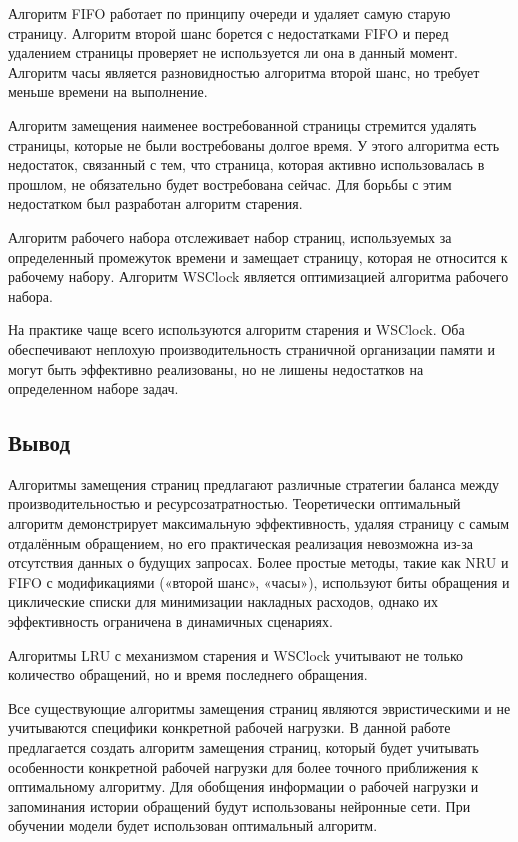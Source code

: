 Алгоритм FIFO работает по принципу очереди и удаляет самую старую страницу.
Алгоритм второй шанс борется с недостатками FIFO и перед удалением страницы проверяет не используется ли она в данный момент.
Алгоритм часы является разновидностью алгоритма второй шанс, но требует меньше времени на выполнение.

Алгоритм замещения наименее востребованной страницы стремится удалять страницы, которые не были востребованы долгое время. 
У этого алгоритма есть недостаток, связанный с тем, что страница, которая активно использовалась в прошлом, не обязательно будет востребована сейчас. 
Для борьбы с этим недостатком был разработан алгоритм старения.

Алгоритм рабочего набора отслеживает набор страниц, используемых за определенный промежуток времени и замещает страницу, которая не относится к рабочему набору.
Алгоритм WSClock является оптимизацией алгоритма рабочего набора.

На практике чаще всего используются алгоритм старения и WSClock.
Оба обеспечивают неплохую производительность страничной организации памяти и могут быть эффективно реализованы, но не лишены недостатков на определенном наборе задач.

\subsection{Вывод}
Алгоритмы замещения страниц предлагают различные стратегии баланса между производительностью и ресурсозатратностью.
Теоретически оптимальный алгоритм демонстрирует максимальную эффективность, удаляя страницу с самым отдалённым обращением, но его практическая реализация невозможна из-за отсутствия данных о будущих запросах. 
Более простые методы, такие как NRU и FIFO с модификациями («второй шанс», «часы»), используют биты обращения и циклические списки для минимизации накладных расходов, однако их эффективность ограничена в динамичных сценариях.

Алгоритмы LRU с механизмом старения и WSClock учитывают не только количество обращений, но и время последнего обращения.

Все существующие алгоритмы замещения страниц являются эвристическими и не учитываются специфики конкретной рабочей нагрузки.
В данной работе предлагается создать алгоритм замещения страниц, который будет учитывать особенности конкретной рабочей нагрузки для более точного приближения к оптимальному алгоритму.
Для обобщения информации о рабочей нагрузки и запоминания истории обращений будут использованы нейронные сети.
При обучении модели будет использован оптимальный алгоритм.

